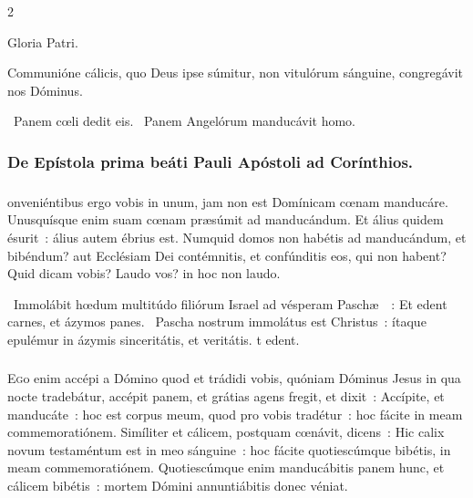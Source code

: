 \documentclass[9pt,twoside]{extarticle}
\begin{document}
\begin{multicols}{2}
{Gloria Patri.

\begin{tightlist}{}
\item {} Communióne cálicis, quo Deus ipse súmitur, non vitulórum sánguine, congregávit nos Dóminus.
\item {}~Panem cœli dedit eis. ~Panem Angelórum manducávit homo.
\item {}
\end{tightlist}

\subsubsection*{\center De Epístola prima beáti Pauli Apóstoli ad Corínthios.}
\subsubsection*{\center {}}
onveniéntibus ergo vobis in unum, jam non est Domínicam cœnam manducáre. Unusquísque enim suam cœnam præsúmit ad manducándum. Et álius quidem ésurit~: álius autem ébrius est. Numquid domos non habétis ad manducándum, et bibéndum? aut Ecclésiam Dei contémnitis, et confúnditis eos, qui non habent? Quid dicam vobis? Laudo vos? in hoc non laudo.

\begin{tightlist}{}
\item {}~Immolábit hœdum multitúdo filiórum Israel ad vésperam Paschæ~~: \textred{*} Et edent carnes, et ázymos panes. ~Pascha nostrum immolátus est Christus~: ítaque epulémur in ázymis sinceritátis, et veritátis. t edent.
\end{tightlist}

\subsubsection*{\center{}}
\lettrine{E}go enim accépi a Dómino quod et trádidi vobis, quóniam Dóminus Jesus in qua nocte tradebátur, accépit panem, et grátias agens fregit, et dixit~: Accípite, et manducáte~: hoc est corpus meum, quod pro vobis tradétur~: hoc fácite in meam commemoratiónem. Simíliter et cálicem, postquam cœnávit, dicens~: Hic calix novum testaméntum est in meo sánguine~: hoc fácite quotiescúmque bibétis, in meam commemoratiónem. Quotiescúmque enim manducábitis panem hunc, et cálicem bibétis~: mortem Dómini annuntiábitis donec véniat.

}
\end{multicols}
\end{document}
